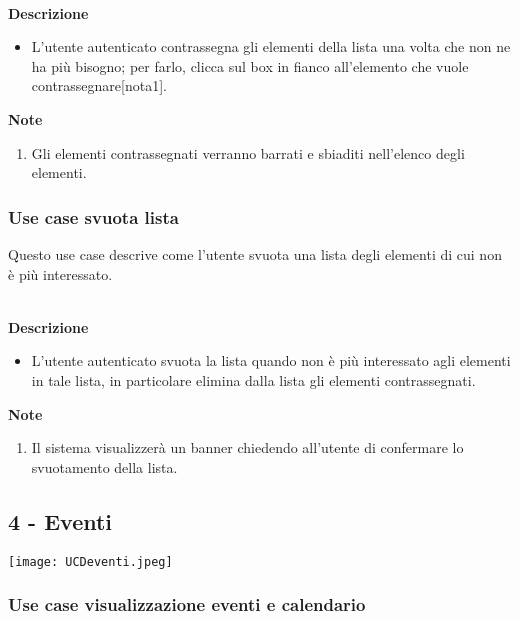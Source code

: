 \documentclass[a4paper,12pt]{article}
\begin{document}
\textbf{\\Descrizione}
\begin{itemize} \setlength\itemsep{0.01em}
\item L'utente autenticato contrassegna gli elementi della lista una volta che non ne ha più bisogno; per farlo, clicca sul box in fianco all'elemento che vuole contrassegnare[nota1].
\end{itemize}

\textbf{Note}
\begin{enumerate} \setlength\itemsep{0.01em}
\item Gli elementi contrassegnati verranno barrati e sbiaditi nell'elenco degli elementi.
\end{enumerate}



\subsubsection*{Use case svuota lista}

Questo use case descrive come l'utente svuota una lista degli elementi di cui non è più interessato.

\textbf{\\Descrizione}
\begin{itemize} \setlength\itemsep{0.01em}
\item L'utente autenticato svuota la lista quando non è più interessato agli elementi in tale lista, in particolare elimina dalla lista gli elementi contrassegnati.
\end{itemize}

\textbf{Note}
\begin{enumerate} \setlength\itemsep{0.01em}
\item Il sistema visualizzerà un banner chiedendo all'utente di confermare lo svuotamento della lista.
\end{enumerate}







\subsection*{4 - Eventi }

\begin{center}
  \texttt{[image: UCDeventi.jpeg]}
\end{center}
\subsubsection*{Use case visualizzazione eventi e calendario}
\end{document}
